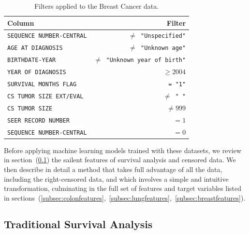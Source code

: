 \documentclass[a4paper,11pt]{article}
\newcommand{\codewhite}[1]{\colorbox{white}{\texttt{#1}}}
\begin{document}
\begin{table}[tbp]
\begin{center}
\begin{tabular}{lr}
\toprule
 Column &  Filter \\
\midrule
\codewhite{SEQUENCE NUMBER-CENTRAL} & \codewhite{$\neq$ "Unspecified"} \\
\codewhite{AGE AT DIAGNOSIS} & \codewhite{$\neq$ "Unknown age"} \\
\codewhite{BIRTHDATE-YEAR} & \codewhite{$\neq$ "Unknown year of birth"} \\
\codewhite{YEAR OF DIAGNOSIS} & \codewhite{$\geq 2004$} \\
\codewhite{SURVIVAL MONTHS FLAG} & \codewhite{= "1"}\\
\codewhite{CS TUMOR SIZE EXT/EVAL} & \codewhite{$\neq$ " "} \\
\codewhite{CS TUMOR SIZE} & \codewhite{$\neq 999$} \\
\codewhite{SEER RECORD NUMBER} & \codewhite{$= 1$} \\
\codewhite{SEQUENCE NUMBER-CENTRAL} & \codewhite{$=0$} \\
\bottomrule
\end{tabular}
\caption{\label{tab:breastfilter} Filters applied to the Breast Cancer data.}
\end{center}
\end{table}




Before applying machine learning models trained with these datasets, we review in section~(\ref{subsec:survprimer}) the sailent features of survival analysis and censored data. We then describe in detail a method that takes full advantage of all the data, including the right-censored data, and which involves a simple and intuitive transformation, culminating in the full set of features and target variables listed in sections~(\ref{subsec:colonfeatures},~\ref{subsec:lungfeatures},~\ref{subsec:breastfeatures}).


\subsection{Traditional Survival Analysis}

\label{subsec:survprimer}

\end{document}
